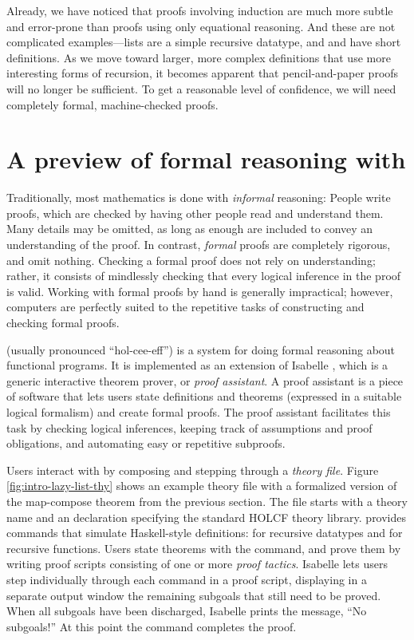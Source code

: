 Already, we have noticed that proofs involving induction are much more subtle and error-prone than proofs using only equational reasoning. And these are not complicated examples---lists are a simple recursive datatype, and  and  have short definitions. As we move toward larger, more complex definitions that use more interesting forms of recursion, it becomes apparent that pencil-and-paper proofs will no longer be sufficient. To get a reasonable level of confidence, we will need completely formal, machine-checked proofs.

\section{A preview of formal reasoning with }

Traditionally, most mathematics is done with \emph{informal} reasoning: People write proofs, which are checked by having other people read and understand them. Many details may be omitted, as long as enough are included to convey an understanding of the proof. In contrast, \emph{formal} proofs are completely rigorous, and omit nothing. Checking a formal proof does not rely on understanding; rather, it consists of mindlessly checking that every logical inference in the proof is valid. Working with formal proofs by hand is generally impractical; however, computers are perfectly suited to the repetitive tasks of constructing and checking formal proofs.

 (usually pronounced ``hol-cee-eff'') is a system for doing formal reasoning about functional programs. It is implemented as an extension of Isabelle \cite{isabelle-tutorial}, which is a generic interactive theorem prover, or \emph{proof assistant}. A proof assistant is a piece of software that lets users state definitions and theorems (expressed in a suitable logical formalism) and create formal proofs. The proof assistant facilitates this task by checking logical inferences, keeping track of assumptions and proof obligations, and automating easy or repetitive subproofs.

Users interact with  by composing and stepping through a \emph{theory file}. Figure \ref{fig:intro-lazy-list-thy} shows an example theory file with a formalized version of the map-compose theorem from the previous section. The file starts with a theory name and an  declaration specifying the standard HOLCF theory library.  provides commands that simulate Haskell-style definitions:  for recursive datatypes and  for recursive functions. Users state theorems with the  command, and prove them by writing proof scripts consisting of one or more \emph{proof tactics}. Isabelle lets users step individually through each  command in a proof script, displaying in a separate output window the remaining subgoals that still need to be proved. When all subgoals have been discharged, Isabelle prints the message, ``No subgoals!'' At this point the  command completes the proof.

